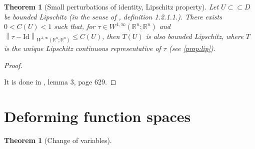 \documentclass[english,a4paper,9pt,oneside]{scrbook}	%
\theoremstyle{break}
\newtheorem{thm}[equation]{Theorem}
\newtheorem{prop}[equation]{Proposition}
\newenvironment{mproof}[1][\proofname]{%
  \begin{proof}[#1]$ $\par\nobreak\ignorespaces
}{%
  \end{proof}
}
\renewcommand*{\proofname}{Proof}
\theoremstyle{remark}
\newcommand{\mR}{\mathbb{R}}
\newcommand{\norm}[1]{\left\lVert#1\right\rVert}
\newcommand{\cc}{\subset\subset}
\newcommand{\cT}{\pazocal{T}}
\newcommand{\id}{\text{Id}}
\newcommand{\te}{\theta}
\newcommand{\Te}{\Theta}
\begin{document}
\begin{appendices}
\begin{thm}[Small perturbations of identity, Lipschitz property]
\label{thm:ptb_id_lip}
Let $U\cc D$ be bounded Lipschitz (in the sense of \cite{grisvard}, definition 1.2.1.1.). There exists $0<C(U)<1$ such that, for $\tau \in W^{1,\infty}(\mR^n;\mR^n)$ and $\norm{\tau - \id}_{W^{1,\infty}(\mR^n;\mR^n)}\leq C(U)$, then $T(U)$ is also bounded Lipschitz, where $T$ is the unique Lipschitz continuous representative of $\tau$ (see \cref{prop:lip}).

\end{thm}

\begin{mproof}
It is done in \cite{bello}, lemma 3, page 629.
\end{mproof}



%
%
%
%
%
%
%
%
%
%
%

\section{Deforming function spaces}

\begin{thm}[Change of variables]
\label{thm:change}


\end{thm}
\end{appendices}
\end{document}
